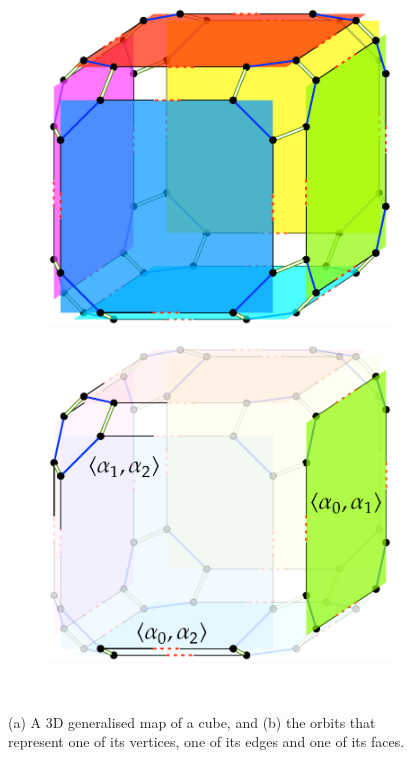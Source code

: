 \begin{figure}
\centering
\begin{subfigure}{0.4\linewidth}
\includegraphics[width=\linewidth]{figs/darts-of-cell-1}
\caption{}%
\label{subfig:darts-of-cell-1}
\end{subfigure}%
\quad
\begin{subfigure}{0.4\linewidth}
\includegraphics[width=\linewidth]{figs/darts-of-cell-2}
\caption{}%
\label{subfig:darts-of-cell-2}
\end{subfigure}\\
\caption{(a) A 3D generalised map of a cube, and (b) the orbits that represent one of its vertices, one of its edges and one of its faces.}%
\label{fig:darts-of-cell}
\end{figure}


